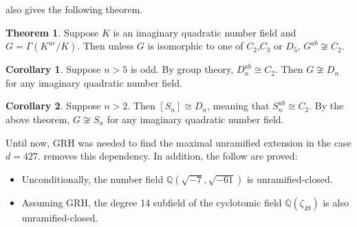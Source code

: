 \documentclass[12pt]{extarticle}
\newcommand{\Q}{\mathbb{Q}}
\newcommand{\<}{\langle}
\renewcommand{\>}{\rangle}
\theoremstyle{definition}
\newtheorem{theorem}{Theorem}
\newtheorem{corollary}{Corollary}
\begin{document}
\cite{YAMAMURA1996} also gives the following theorem. 
\begin{theorem}
Suppose $K$ is an imaginary quadratic number field and $G = \Gamma(K^{ur}/K)$.  Then unless $G$ is isomorphic to one of $C_2$,$C_3$ or $D_5$, $G^{ab} \not \cong C_2$. 
\end{theorem}

\begin{corollary}
Suppose $n>5$ is odd. By group theory, $D_n^{ab} \cong C_2$. Then $G \not \cong D_n$ for any imaginary quadratic number field.
\end{corollary}
\begin{corollary}
Suppose $n>2$. Then $[S_n] \cong D_n$, meaning that $S_n^{ab} \cong C_2$. By the above theorem, $G \not \cong S_n$ for any imaginary quadratic number field.
\end{corollary}
Until now, GRH was needed to find the maximal unramified extension in the case $d = 427$. \cite{Wong2015} removes this dependency. In addition, the follow are proved:
\begin{itemize}
\item Unconditionally, the number field $\Q(\sqrt{-7},\sqrt{-61})$ is unramified-closed.
\item  Assuming GRH, the degree 14 subfield of the cyclotomic field $\Q(\zeta_49)$ is also unramified-closed. 
\end{itemize}
\end{document}
